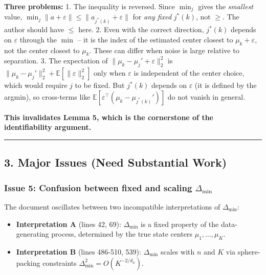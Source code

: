 \documentclass[
  12pt,
]{ctexart}
\providecommand{\tightlist}{%
  \setlength{\itemsep}{0pt}\setlength{\parskip}{0pt}}
\begin{document}
\textbf{Three problems:} 1. The inequality is reversed. Since \(\min_j\)
gives the \emph{smallest} value,
\(\min_j \|a + \varepsilon\| \leq \|a_{j^*(k)} + \varepsilon\|\) for
\emph{any fixed} \(j^*(k)\), not \(\geq\). The author should have
\(\leq\) here. 2. Even with the correct direction, \(j^*(k)\) depends on
\(\varepsilon\) through the \(\min\) -- it is the index of the estimated
center closest to \(\mu_k + \varepsilon\), not the center closest to
\(\mu_k\). These can differ when noise is large relative to separation.
3. The expectation of \(\|\mu_k - \mu_j' + \varepsilon\|_2^2\) is
\(\|\mu_k - \mu_j'\|_2^2 + \mathbb{E}[\|\varepsilon\|_2^2]\) only when
\(\varepsilon\) is independent of the center choice, which would require
\(j\) to be fixed. But \(j^*(k)\) depends on \(\varepsilon\) (it is
defined by the argmin), so cross-terms like
\(\mathbb{E}[\varepsilon^\top(\mu_k - \mu_{j^*(k)}')]\) do not vanish in
general.

\textbf{This invalidates Lemma 5, which is the cornerstone of the
identifiability argument.}

\begin{center}\rule{0.5\linewidth}{0.5pt}\end{center}

\subsection{3. Major Issues (Need Substantial
Work)}\label{major-issues-need-substantial-work}

\subsubsection{\texorpdfstring{Issue 5: Confusion between fixed and
scaling
\(\Delta_{\min}\)}{Issue 5: Confusion between fixed and scaling \textbackslash Delta\_\{\textbackslash min\}}}\label{issue-5-confusion-between-fixed-and-scaling-delta_min}

The document oscillates between two incompatible interpretations of
\(\Delta_{\min}\):

\begin{itemize}
\tightlist
\item
  \textbf{Interpretation A} (lines 42, 69): \(\Delta_{\min}\) is a fixed
  property of the data-generating process, determined by the true state
  centers \(\mu_1, \dots, \mu_K\).
\item
  \textbf{Interpretation B} (lines 486-510, 539): \(\Delta_{\min}\)
  scales with \(n\) and \(K\) via sphere-packing constraints
  \(\Delta_{\min}^2 = O(K^{-2/d_\phi})\).
\end{itemize}
\end{document}
